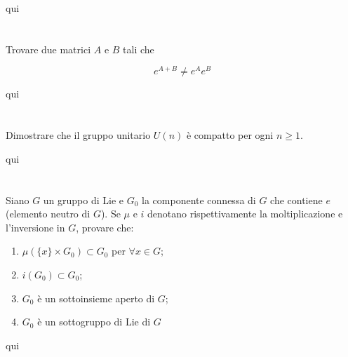 qui

\tocless\section{}\label{es3-4}

\begin{tcolorbox}
	Trovare due matrici $ A $ e $ B $ tali che
	
	\begin{equation}
		e^{A+B} \neq e^{A} e^{B}
	\end{equation}
\end{tcolorbox}

qui

\tocless\section{}\label{es3-5}

\begin{tcolorbox}
	Dimostrare che il gruppo unitario $ U(n) $ è compatto per ogni $ n \geqslant 1 $.
\end{tcolorbox}

qui

\tocless\section{}\label{es3-6}

\begin{tcolorbox}
	Siano $ G $ un gruppo di Lie e $ G_{0} $ la componente connessa di $ G $ che contiene $ e $ (elemento neutro di $ G $). Se $ \mu $ e $ i $ denotano rispettivamente la moltiplicazione e l'inversione in $ G $, provare che:
	
	\begin{enumerate}
		\item $ \mu(\{x\} \times G_{0}) \subset G_{0} $ per $ \forall x \in G $;
		
		\item $ i(G_{0}) \subset G_{0} $;
		
		\item $ G_{0} $ è un sottoinsieme aperto di $ G $;
		
		\item $ G_{0} $ è un sottogruppo di Lie di $ G $
	\end{enumerate}
\end{tcolorbox}

qui

\tocless\section{}\label{BONUS3-1}

